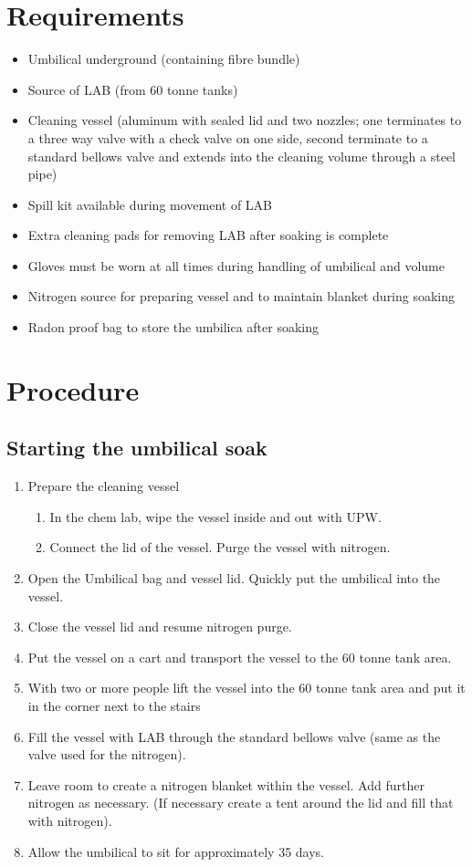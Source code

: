 \section{Requirements}

\begin{itemize}
\item Umbilical underground (containing fibre bundle)
\item Source of LAB (from 60 tonne tanks)
\item Cleaning vessel (aluminum with sealed lid and two nozzles; one terminates to a three way valve with a check valve on one side, second terminate to a standard bellows valve and extends into the cleaning volume through a steel pipe)
\item Spill kit available during movement of LAB
\item Extra cleaning pads for removing LAB after soaking is complete
\item Gloves must be worn at all times during handling of umbilical and volume
\item Nitrogen source for preparing vessel and to maintain blanket during soaking
\item Radon proof bag to store the umbilica after soaking
\end{itemize}

\section{Procedure}
\subsection{Starting the umbilical soak}
\begin{enumerate}
\item Prepare the cleaning vessel
  \begin{enumerate}
  \item In the chem lab, wipe the vessel inside and out with UPW. 
  \item Connect the lid of the vessel. Purge the vessel with nitrogen.
  \end{enumerate}
\item Open the Umbilical bag and vessel lid. Quickly put the umbilical into the vessel.
\item Close the vessel lid and resume nitrogen purge.
\item Put the vessel on a cart and transport the vessel to the 60 tonne tank area.
\item With two or more people lift the vessel into the 60 tonne tank area and put it in the corner next to the stairs
\item Fill the vessel with LAB through the standard bellows valve (same as the valve used for the nitrogen).
\item Leave room to create a nitrogen blanket within the vessel. Add further nitrogen as necessary. (If necessary create a tent around the lid and fill that with nitrogen).
\item Allow the umbilical to sit for approximately 35 days.
\end{enumerate}  

